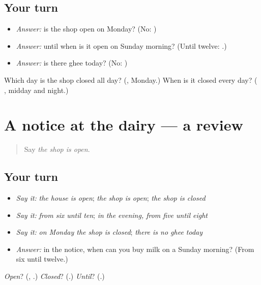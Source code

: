 \subsection*{Your turn}
\begin{itemize}
\raggedright
  \item \emph{Answer:} is the shop open on Monday? (No: \textbf{   })
  \item \emph{Answer:} until when is it open on Sunday morning? (Until twelve: \textbf{ }.)
  \item \emph{Answer:} is there ghee today? (No: \textbf{  })
\end{itemize}

\begin{tcolorbox}[breakable,colback=teal!4,colframe=teal!35!black,title={Before you move on}]
Which day is the shop closed all day? (\textbf{}, Monday.) When is it closed every day? (\textbf{  }, midday and night.)
\end{tcolorbox}
\section[(dialogue)]{A notice at the dairy — a review}

\label{lesson:MW-R164-dairy}



\begin{quote}
Say \emph{the shop is open}.
\end{quote}

\subsection*{Your turn}
\begin{itemize}
\raggedright
  \item \emph{Say it:} \emph{the house is open}; \emph{the shop is open}; \emph{the shop is closed}
  \item \emph{Say it:} \emph{from six until ten}; \emph{in the evening, from five until eight}
  \item \emph{Say it:} \emph{on Monday the shop is closed}; \emph{there is no ghee today}
  \item \emph{Answer:} in the notice, when can you buy milk on a Sunday morning? (From six until twelve.)
\end{itemize}

\begin{tcolorbox}[breakable,colback=teal!4,colframe=teal!35!black,title={Before you move on}]
\emph{Open}? (\textbf{}, \textbf{}.) \emph{Closed}? (\textbf{}.) \emph{Until}? (\textbf{}.)
\end{tcolorbox}

